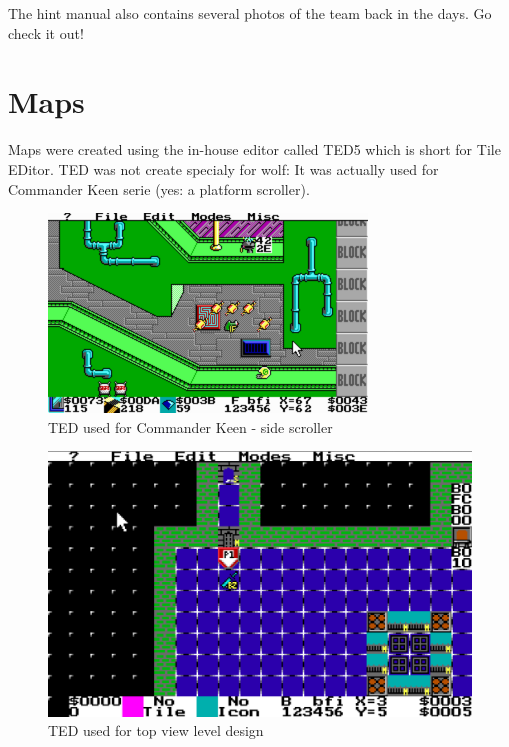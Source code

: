 \documentclass[book.tex]{subfiles}
\begin{document}
\par 
The hint manual also contains several photos of the team back in the days. Go check it out!













\section{Maps}
Maps were created using the in-house editor called TED5 which is short for Tile EDitor. TED was not create specialy for wolf: It was actually used for Commander Keen serie (yes: a platform scroller).\\

 \begin{figure}[H]
\centering
 \includegraphics[width=\textwidth]{imgs/ted5_scrolling_map.png}
 \caption{TED used for Commander Keen - side scroller} 
 \end{figure}


\begin{figure}[H]
\centering
 \includegraphics[width=\textwidth]{imgs/TED.png}
 \caption{TED used for top view level design} 
 \end{figure}
\end{document}
